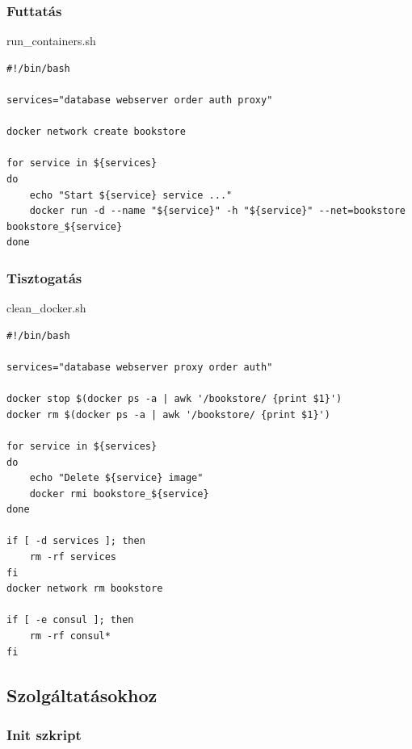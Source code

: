 \documentclass[11pt,magyar,a4paper,twoside,]{report}
\begin{document}
\subsubsection{\texorpdfstring{Futtatás\label{appendix-runner}}{Futtatás}}\label{futtatuxe1s}

run\_containers.sh

\begin{verbatim}
#!/bin/bash

services="database webserver order auth proxy"

docker network create bookstore

for service in ${services}
do
    echo "Start ${service} service ..."
    docker run -d --name "${service}" -h "${service}" --net=bookstore bookstore_${service}
done
\end{verbatim}

\subsubsection{\texorpdfstring{Tisztogatás\label{appendix-cleanup}}{Tisztogatás}}\label{tisztogatuxe1s}

clean\_docker.sh

\begin{verbatim}
#!/bin/bash

services="database webserver proxy order auth"

docker stop $(docker ps -a | awk '/bookstore/ {print $1}')
docker rm $(docker ps -a | awk '/bookstore/ {print $1}')

for service in ${services}
do
    echo "Delete ${service} image"
    docker rmi bookstore_${service}
done

if [ -d services ]; then
    rm -rf services
fi
docker network rm bookstore

if [ -e consul ]; then
    rm -rf consul*
fi
\end{verbatim}

\subsection{Szolgáltatásokhoz}\label{szolguxe1ltatuxe1sokhoz}

\subsubsection{\texorpdfstring{Init
szkript\label{appendix-starter}}{Init szkript}}\label{init-szkript}
\end{document}
